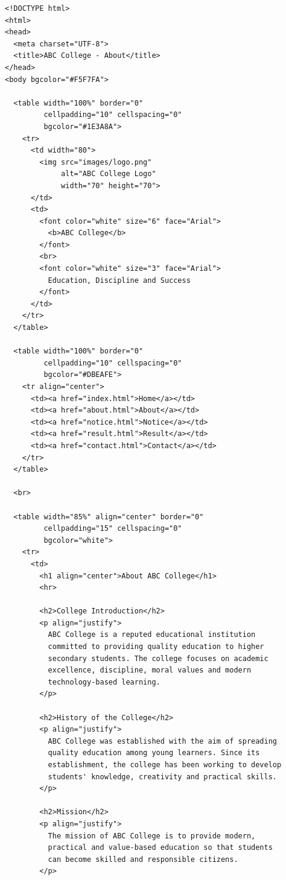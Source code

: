 \par{}\par
\begin{multicols}{2}
\begin{verbatim}
<!DOCTYPE html>
<html>
<head>
  <meta charset="UTF-8">
  <title>ABC College - About</title>
</head>
<body bgcolor="#F5F7FA">

  <table width="100%" border="0"
         cellpadding="10" cellspacing="0"
         bgcolor="#1E3A8A">
    <tr>
      <td width="80">
        <img src="images/logo.png"
             alt="ABC College Logo"
             width="70" height="70">
      </td>
      <td>
        <font color="white" size="6" face="Arial">
          <b>ABC College</b>
        </font>
        <br>
        <font color="white" size="3" face="Arial">
          Education, Discipline and Success
        </font>
      </td>
    </tr>
  </table>

  <table width="100%" border="0"
         cellpadding="10" cellspacing="0"
         bgcolor="#DBEAFE">
    <tr align="center">
      <td><a href="index.html">Home</a></td>
      <td><a href="about.html">About</a></td>
      <td><a href="notice.html">Notice</a></td>
      <td><a href="result.html">Result</a></td>
      <td><a href="contact.html">Contact</a></td>
    </tr>
  </table>

  <br>

  <table width="85%" align="center" border="0"
         cellpadding="15" cellspacing="0"
         bgcolor="white">
    <tr>
      <td>
        <h1 align="center">About ABC College</h1>
        <hr>

        <h2>College Introduction</h2>
        <p align="justify">
          ABC College is a reputed educational institution
          committed to providing quality education to higher
          secondary students. The college focuses on academic
          excellence, discipline, moral values and modern
          technology-based learning.
        </p>

        <h2>History of the College</h2>
        <p align="justify">
          ABC College was established with the aim of spreading
          quality education among young learners. Since its
          establishment, the college has been working to develop
          students' knowledge, creativity and practical skills.
        </p>

        <h2>Mission</h2>
        <p align="justify">
          The mission of ABC College is to provide modern,
          practical and value-based education so that students
          can become skilled and responsible citizens.
        </p>


\end{verbatim}
\end{multicols}
